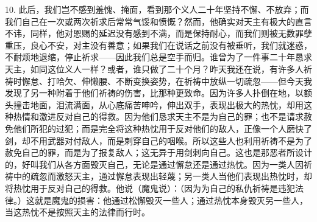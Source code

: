 10. 此后，我们岂不感到羞愧、掩面，看到那个义人二十年坚持不懈、不放弃；而我们自己在一次或两次祈求后常常气馁和愤慨？然而，他确实对天主有极大的直言不讳，同样，他对恩赐的延迟没有感到不满，而是保持耐心，而我们则被无数罪孽重压，良心不安，对主没有善意；如果我们在说话之前没有被垂听，我们就迷惑，不耐烦地退缩，停止祈求——因此我们总是空手而归。谁曾为了一件事二十年恳求天主，如同这位义人一样？或者，谁只做了二十个月？昨天我还在说，有许多人祈祷时懈怠、打哈欠、伸懒腰、不断变换姿势，在祈祷中放纵一切疏忽——但今天我发现了另一种附着于他们祈祷的伤害，比那种更致命。因为许多人扑倒在地，以额头撞击地面，泪流满面，从心底痛苦呻吟，伸出双手，表现出极大的热忱，却用这种热情和激进反对自己的得救。因为他们恳求天主不是为自己的罪；也不是请求赦免他们所犯的过犯；而是完全将这种热忱用于反对他们的敌人，正像一个人磨快了剑，却不用武器对付敌人，而是刺穿自己的咽喉。所以这些人也利用祈祷不是为了赦免自己的罪，而是为了报复敌人；这无异于用剑刺向自己。这也是那恶者所设计的，好叫我们从各方面毁灭自己，无论是通过懈怠还是通过热忱。因为一类人因祈祷中的疏忽而激怒天主，通过懈怠表现出轻蔑；另一类人当他们表现出热忱时，却将热忱用于反对自己的得救。他说（魔鬼说）：（因为为自己的私仇祈祷是违犯法律。）这就是魔鬼的损害：他通过松懈毁灭一些人；通过热忱本身毁灭另一些人，当这热忱不是按照天主的法律而行时。\par

